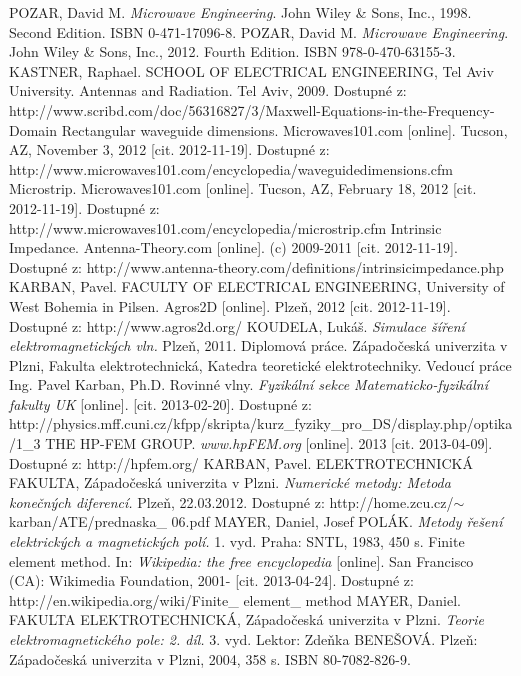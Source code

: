 \documentclass[12pt,a4paper,oneside]{article}
\numberwithin{equation}{section} %
\numberwithin{figure}{section} %
\numberwithin{table}{section} %
\begin{document}
\newpage
{} %
\begin{thebibliography}{10}

 POZAR, David M. \textit{Microwave Engineering}. John Wiley \& Sons, Inc., 1998. Second Edition. ISBN 0-471-17096-8.
 POZAR, David M. \textit{Microwave Engineering}. John Wiley \& Sons, Inc., 2012. Fourth Edition. ISBN 978-0-470-63155-3.
 KASTNER, Raphael. SCHOOL OF ELECTRICAL ENGINEERING, Tel Aviv University. Antennas and Radiation. Tel Aviv, 2009. Dostupné z: http://www.scribd.com/doc/56316827/3/Maxwell-Equations-in-the-Frequency-Domain
 Rectangular waveguide dimensions. Microwaves101.com [online]. Tucson, AZ, November 3, 2012 [cit. 2012-11-19]. Dostupné z: http://www.microwaves101.com/encyclopedia/waveguidedimensions.cfm
 Microstrip. Microwaves101.com [online]. Tucson, AZ, February 18, 2012 [cit. 2012-11-19]. Dostupné z: http://www.microwaves101.com/encyclopedia/microstrip.cfm
 Intrinsic Impedance. Antenna-Theory.com [online]. (c) 2009-2011 [cit. 2012-11-19]. Dostupné z: http://www.antenna-theory.com/definitions/intrinsicimpedance.php
 KARBAN, Pavel. FACULTY OF ELECTRICAL ENGINEERING, University of West Bohemia in Pilsen. Agros2D [online]. Plzeň, 2012 [cit. 2012-11-19]. Dostupné z: http://www.agros2d.org/
 KOUDELA, Lukáš. \textit{Simulace šíření elektromagnetických vln.} Plzeň, 2011. Diplomová práce. Západočeská univerzita v Plzni, Fakulta elektrotechnická, Katedra teoretické elektrotechniky. Vedoucí práce Ing. Pavel Karban, Ph.D.
 Rovinné vlny. \textit{Fyzikální sekce Matematicko-fyzikální fakulty UK} [online]. [cit. 2013-02-20]. Dostupné z: http://physics.mff.cuni.cz/kfpp/skripta/kurz\_fyziky\_pro\_DS/display.php/optika/1\_3
 THE HP-FEM GROUP. \textit{www.hpFEM.org} [online]. 2013 [cit. 2013-04-09]. Dostupné z: http://hpfem.org/
 KARBAN, Pavel. ELEKTROTECHNICKÁ FAKULTA, Západočeská univerzita v Plzni. \textit{Numerické metody: Metoda konečných diferencí.} Plzeň, 22.03.2012. Dostupné z: http://home.zcu.cz/$\sim$karban/ATE/prednaska\_ 06.pdf
 MAYER, Daniel, Josef POLÁK. \textit{Metody řešení elektrických a magnetických polí.} 1. vyd. Praha: SNTL, 1983, 450 s.
 Finite element method. In: \textit{Wikipedia: the free encyclopedia} [online]. San Francisco (CA): Wikimedia Foundation, 2001- [cit. 2013-04-24]. Dostupné z: http://en.wikipedia.org/wiki/Finite\_ element\_ method
 MAYER, Daniel. FAKULTA ELEKTROTECHNICKÁ, Západočeská univerzita v Plzni. \textit{Teorie elektromagnetického pole: 2. díl.} 3. vyd. Lektor: Zdeňka BENEŠOVÁ. Plzeň: Západočeská univerzita v Plzni, 2004, 358 s. ISBN 80-7082-826-9.


\end{thebibliography}
\end{document}
